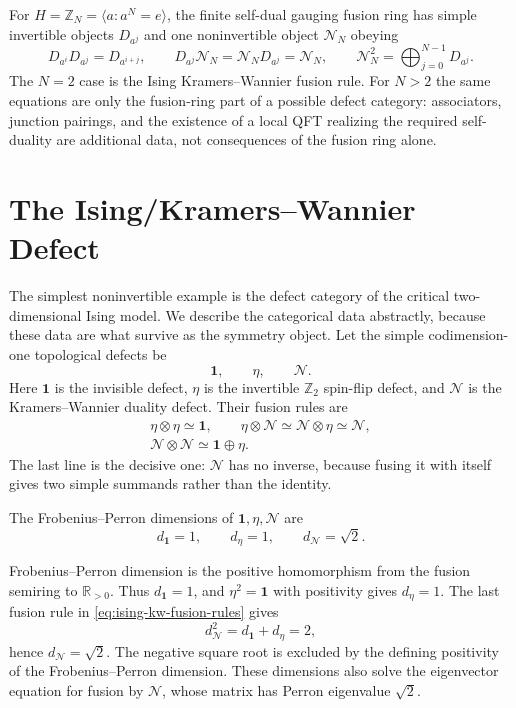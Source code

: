 \begin{example}
\label{ex:cyclic-self-dual-gauging-fusion-rings}
For \(H=\mathbb Z_N=\langle a:a^N=e\rangle\), the finite self-dual gauging
fusion ring has simple invertible objects \(D_{a^j}\) and one noninvertible
object \(\mathcal N_N\) obeying
\[
  D_{a^i}D_{a^j}=D_{a^{i+j}},
  \qquad
  D_{a^j}\mathcal N_N=\mathcal N_ND_{a^j}=\mathcal N_N,
  \qquad
  \mathcal N_N^2=\bigoplus_{j=0}^{N-1}D_{a^j}.
\]
The \(N=2\) case is the Ising Kramers--Wannier fusion rule.  For \(N>2\) the
same equations are only the fusion-ring part of a possible defect category:
associators, junction pairings, and the existence of a local QFT realizing
the required self-duality are additional data, not consequences of the fusion
ring alone.
\end{example}

\section{The Ising/Kramers--Wannier Defect}

The simplest noninvertible example is the defect category of the critical
two-dimensional Ising model.  We describe the categorical data abstractly,
because these data are what survive as the symmetry object.  Let
the simple codimension-one topological defects be
\[
  \mathbf 1,\qquad \eta,\qquad \mathcal N .
\]
Here \(\mathbf 1\) is the invisible defect, \(\eta\) is the invertible
\(\mathbb Z_2\) spin-flip defect, and \(\mathcal N\) is the
Kramers--Wannier duality defect.  Their fusion rules are
\begin{equation}
\begin{gathered}
  \eta\otimes\eta\simeq\mathbf 1,\qquad
  \eta\otimes\mathcal N\simeq
  \mathcal N\otimes\eta\simeq\mathcal N,\\
  \mathcal N\otimes\mathcal N\simeq\mathbf 1\oplus\eta .
\end{gathered}
  \label{eq:ising-kw-fusion-rules}
\end{equation}
The last line is the decisive one: \(\mathcal N\) has no inverse, because
fusing it with itself gives two simple summands rather than the identity.

\begin{remark}
\label{rem:ising-defect-quantum-dimensions}
The Frobenius--Perron dimensions of
\(\mathbf 1,\eta,\mathcal N\) are
\[
  d_{\mathbf 1}=1,\qquad d_\eta=1,\qquad d_{\mathcal N}=\sqrt2 .
\]

Frobenius--Perron dimension is the positive homomorphism from the fusion
semiring to \(\mathbb R_{>0}\).  Thus \(d_{\mathbf 1}=1\), and
\(\eta^2=\mathbf 1\) with positivity gives \(d_\eta=1\).  The last fusion
rule in \eqref{eq:ising-kw-fusion-rules} gives
\[
  d_{\mathcal N}^2=d_{\mathbf 1}+d_\eta=2,
\]
hence \(d_{\mathcal N}=\sqrt2\).
The negative square root is excluded by the defining positivity of the
Frobenius--Perron dimension.  These dimensions also solve the eigenvector
equation for fusion by \(\mathcal N\), whose matrix has Perron eigenvalue
\(\sqrt2\).
\end{remark}

